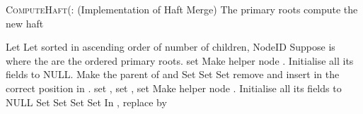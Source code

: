 \documentclass[11pt, letter]{article}
\begin{document}
\begin{algorithm}[ph!]
\caption{\textsc{ComputeHaft(}: (Implementation of Haft Merge) The primary roots
compute the new haft}
\label{algo: ComputeHaft}
\begin{algorithmic}[1]
\STATE Let 
\STATE Let  sorted in ascending order of number of children, NodeID
\STATE Suppose  is  where the  are the  ordered primary roots.
\STATE set 
\WHILE{}
  \IF{ }
  \STATE \label{algocode: mergeeqrep} Make helper node . Initialise all its fields
to NULL.
  \STATE Make   the parent of  and 
   \STATE  Set  
   \ELSE
    \STATE Set  
  \ENDIF
  \STATE Set  
  \STATE remove  and insert   in the correct position in .
  \STATE set , 
  \ENDIF
  \STATE set  ,
\ENDWHILE
\STATE set 
\WHILE{}
\STATE \label{algocode: mergeneqrep} Make helper node . Initialise all its fields to
NULL
\STATE Set  
\STATE Set  
\STATE Set  
\STATE Set  
\STATE In , replace  by   
\ENDWHILE
\end{algorithmic}
\end{algorithm}
\end{document}

